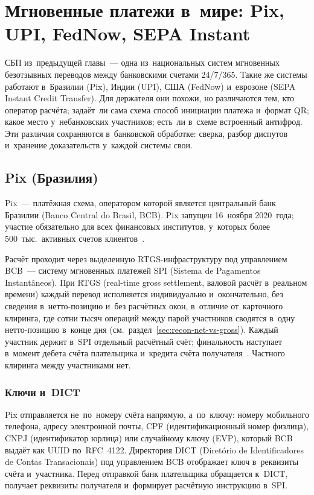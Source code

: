 \chapter{Мгновенные платежи в~мире: Pix, UPI, FedNow, SEPA
Instant}\label{ch:instant-payments-world}

СБП из~предыдущей главы~--- одна из~национальных систем мгновенных безотзывных
переводов между банковскими счетами 24/7/365. Такие же системы работают
в~Бразилии (Pix), Индии (UPI), США (FedNow) и~еврозоне (SEPA Instant Credit
Transfer). Для держателя они похожи, но различаются тем, кто
оператор расчёта; задаёт~ли сама схема способ инициации платежа и~формат QR;
какое место у~небанковских участников; есть~ли в~схеме встроенный антифрод. Эти
различия сохраняются в~банковской обработке: сверка, разбор диспутов и~хранение
доказательств у~каждой системы свои.

\section{Pix (Бразилия)}\label{sec:pix-system}

Pix~--- платёжная схема, оператором которой является центральный банк Бразилии
(Banco Central do Brasil, BCB). Pix запущен 16~ноября 2020~года; участие
обязательно для всех финансовых институтов, у~которых более 500~тыс.\
активных счетов клиентов~\cite{pix,pix-participants}.

Расчёт проходит через выделенную RTGS-инфраструктуру под управлением BCB~---
систему мгновенных платежей SPI (Sistema de Pagamentos Instantâneos). При
RTGS (real-time gross settlement, валовой расчёт в~реальном времени) каждый
перевод исполняется индивидуально и~окончательно, без сведения в~нетто-позицию
и~без расчётных окон, в~отличие от~карточного клиринга, где сотни тысяч операций
между парой участников сводятся в~одну нетто-позицию в~конце дня
(см.~раздел~\ref{sec:recon-net-vs-gross}). Каждый участник держит в~SPI
отдельный расчётный счёт; финальность наступает в~момент дебета счёта
плательщика и~кредита счёта получателя~\cite{pix-spi}. Частного клиринга между
участниками нет.

\subsection*{Ключи и~DICT}\label{subsec:pix-keys-dict}

Pix отправляется не~по~номеру счёта напрямую, а~по~ключу: номеру мобильного
телефона, адресу электронной почты, CPF (идентификационный номер физлица), CNPJ
(идентификатор юрлица) или случайному ключу (EVP), который BCB выдаёт как UUID
по~RFC~4122. Директория DICT (Diretório de
  Identificadores de Contas
Transacionais) под управлением BCB отображает ключ в~реквизиты счёта
и~участника. Перед отправкой банк плательщика обращается к~DICT, получает
реквизиты получателя и~формирует расчётную инструкцию в~SPI.

